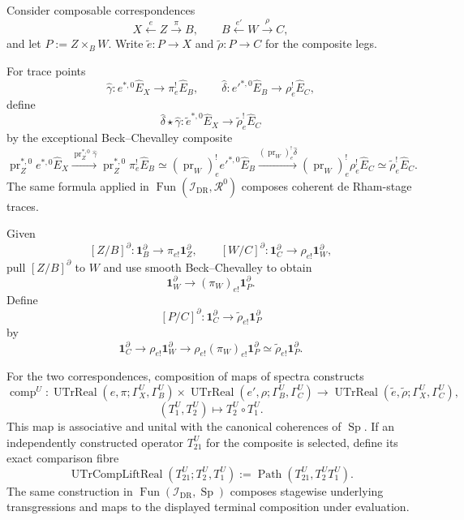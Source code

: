 Consider composable correspondences
\[
X\xleftarrow{e}Z\xrightarrow{\pi}B,
\qquad
B\xleftarrow{e'}W\xrightarrow{\rho}C,
\]
and let $P:=Z\times_BW$.  Write
$\widetilde e:P\to X$ and $\widetilde\rho:P\to C$ for the composite legs.

\begin{construction}
\label{constr:prequantum-composite-differential-trace}
For trace points
\[
\widehat\gamma:e^{*,0}\widehat E_X\to\pi_e^!\widehat E_B,
\qquad
\widehat\delta:e'^{*,0}\widehat E_B\to\rho_e^!\widehat E_C,
\]
define
\[
\boxed{
\widehat\delta\star\widehat\gamma:
\widetilde e^{*,0}\widehat E_X
\longrightarrow
\widetilde\rho_e^!\widehat E_C
}
\]
by the exceptional Beck--Chevalley composite
\[
\operatorname{pr}_Z^{*,0}e^{*,0}\widehat E_X
\xrightarrow{\operatorname{pr}_Z^{*,0}\widehat\gamma}
\operatorname{pr}_Z^{*,0}\pi_e^!\widehat E_B
\simeq
(\operatorname{pr}_W)_e^!e'^{*,0}\widehat E_B
\xrightarrow{(\operatorname{pr}_W)_e^!\widehat\delta}
(\operatorname{pr}_W)_e^!\rho_e^!\widehat E_C
\simeq
\widetilde\rho_e^!\widehat E_C.
\]
The same formula applied in
$\operatorname{Fun}(\mathcal I_{\mathrm{DR}},\mathcal R^0)$ composes coherent
de Rham-stage traces.
\end{construction}

\begin{construction}
\label{constr:prequantum-composite-fundamental-class}
Given
\[
[Z/B]^\partial:
\mathbf1_B^\partial\to\pi_{e!}\mathbf1_Z^\partial,
\qquad
[W/C]^\partial:
\mathbf1_C^\partial\to\rho_{e!}\mathbf1_W^\partial,
\]
pull $[Z/B]^\partial$ to $W$ and use smooth Beck--Chevalley to obtain
\[
\mathbf1_W^\partial
\longrightarrow
(\pi_W)_{e!}\mathbf1_P^\partial.
\]
Define
\[
\boxed{
[P/C]^\partial:
\mathbf1_C^\partial
\longrightarrow
\widetilde\rho_{e!}\mathbf1_P^\partial
}
\]
by
\[
\mathbf1_C^\partial
\to
\rho_{e!}\mathbf1_W^\partial
\to
\rho_{e!}(\pi_W)_{e!}\mathbf1_P^\partial
\simeq
\widetilde\rho_{e!}\mathbf1_P^\partial.
\]
\end{construction}

\begin{construction}
\label{constr:prequantum-underlying-transgression-composition}
For the two correspondences, composition of maps of spectra constructs
\[
\boxed{
\operatorname{comp}^U:
\operatorname{UTrReal}(e,\pi;\Gamma_X^U,\Gamma_B^U)
\times
\operatorname{UTrReal}(e',\rho;\Gamma_B^U,\Gamma_C^U)
\longrightarrow
\operatorname{UTrReal}
(\widetilde e,\widetilde\rho;\Gamma_X^U,\Gamma_C^U),
}
\]
\[
(T_1^U,T_2^U)\longmapsto T_2^U\circ T_1^U.
\]
This map is associative and unital with the canonical coherences of
$\operatorname{Sp}$.  If an independently constructed operator $T_{21}^U$ for
the composite is selected, define its exact comparison fibre
\[
\boxed{
\operatorname{UTrCompLiftReal}
(T_{21}^U;T_2^U,T_1^U)
:=
\operatorname{Path}(T_{21}^U,T_2^UT_1^U).
}
\]
The same construction in
$\operatorname{Fun}(\mathcal I_{\mathrm{DR}},\operatorname{Sp})$ composes
stagewise underlying transgressions and maps to the displayed terminal
composition under evaluation.
\end{construction}

